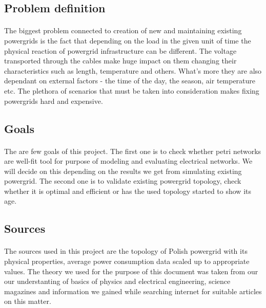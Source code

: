 \documentclass[a4paper]{article}
\begin{document}
\subsection{Problem definition}
\paragraph{}
The biggest problem connected to creation of new and maintaining existing powergrids is the fact that depending on the load in the given unit of time the physical reaction of powergrid infrastructure can be different. The voltage transported through the cables make huge impact on them changing their characteristics such as length, temperature and others. What's more they are also dependant on external factors - the time of the day, the season, air temperature etc. The plethora of scenarios that must be taken into consideration makes fixing powergrids hard and expensive.

\subsection{Goals}                                                                          
\paragraph{}
The are few goals of this project. The first one is to check whether petri networks are well-fit tool for purpose of modeling and evaluating electrical networks. We will decide on this depending on the results we get from simulating existing powergrid. The second one is to validate existing powergrid topology, check whether it is optimal and efficient or has the used topology started to show its age.

\subsection{Sources}
\paragraph{}
The sources used in this project are the topology of Polish powergrid with its physical properties, average power consumption data scaled up to appropriate values. The theory we used for the purpose of this document was taken from our our understanting of basics of physics and electrical engineering, science magazines and information we gained while searching internet for suitable articles on this matter.
\end{document}
